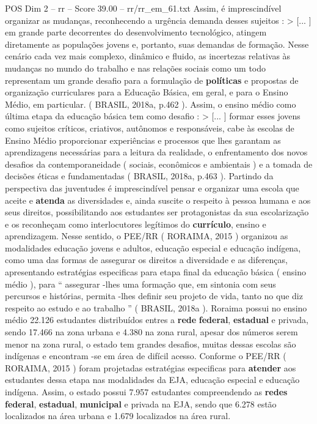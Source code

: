 \begin{textsample}{POS Dim 2 – rr – Score 39.00 – rr/rr\_em\_61.txt}
Assim, é imprescindível organizar as mudanças, reconhecendo a urgência demanda desses sujeitos : > [... ] em grande parte decorrentes do desenvolvimento tecnológico, atingem diretamente as populações jovens e, portanto, suas demandas de formação.
Nesse cenário cada vez mais complexo, dinâmico e fluido, as incertezas relativas às mudanças no mundo do trabalho e nas relações sociais como um todo representam um grande desafio para a formulação de \textbf{políticas} e propostas de organização curriculares para a Educação Básica, em geral, e para o Ensino Médio, em particular. ( BRASIL, 2018a, p.462 ).
Assim, o ensino médio como última etapa da educação básica tem como desafio : > [... ] formar esses jovens como sujeitos críticos, criativos, autônomos e responsáveis, cabe às escolas de Ensino Médio proporcionar experiências e processos que lhes garantam as aprendizagens necessárias para a leitura da realidade, o enfrentamento dos novos desafios da contemporaneidade ( sociais, econômicos e ambientais ) e a tomada de decisões éticas e fundamentadas ( BRASIL, 2018a, p.463 ).
Partindo da perspectiva das juventudes é imprescindível pensar e organizar uma escola que aceite e \textbf{atenda} as diversidades e, ainda suscite o respeito à pessoa humana e aos seus direitos, possibilitando aos estudantes ser protagonistas da sua escolarização e os reconheçam como interlocutores legítimos do \textbf{currículo}, ensino e aprendizagem.
Nesse sentido, o PEE/RR ( RORAIMA, 2015 ) organizou as modalidades educação jovens e adultos, educação especial e educação indígena, como uma das formas de assegurar os direitos a diversidade e as diferenças, apresentando estratégias especificas para etapa final da educação básica ( ensino médio ), para “ assegurar -lhes uma formação que, em sintonia com seus percursos e histórias, permita -lhes definir seu projeto de vida, tanto no que diz respeito ao estudo e ao trabalho ” ( BRASIL, 2018a ).
Roraima possui no ensino médio 22.126 estudantes distribuídos entres a \textbf{rede} \textbf{federal}, \textbf{estadual} e privada, sendo 17.466 na zona urbana e 4.380 na zona rural, apesar dos números serem menor na zona rural, o estado tem grandes desafios, muitas dessas escolas são indígenas e encontram -se em área de difícil acesso.
Conforme o PEE/RR ( RORAIMA, 2015 ) foram projetadas estratégias especificas para \textbf{atender} aos estudantes dessa etapa nas modalidades da EJA, educação especial e educação indígena.
Assim, o estado possui 7.957 estudantes compreendendo as \textbf{redes} \textbf{federal}, \textbf{estadual}, \textbf{municipal} e privada na EJA, sendo que 6.278 estão localizados na área urbana e 1.679 localizados na área rural.

\end{textsample}
